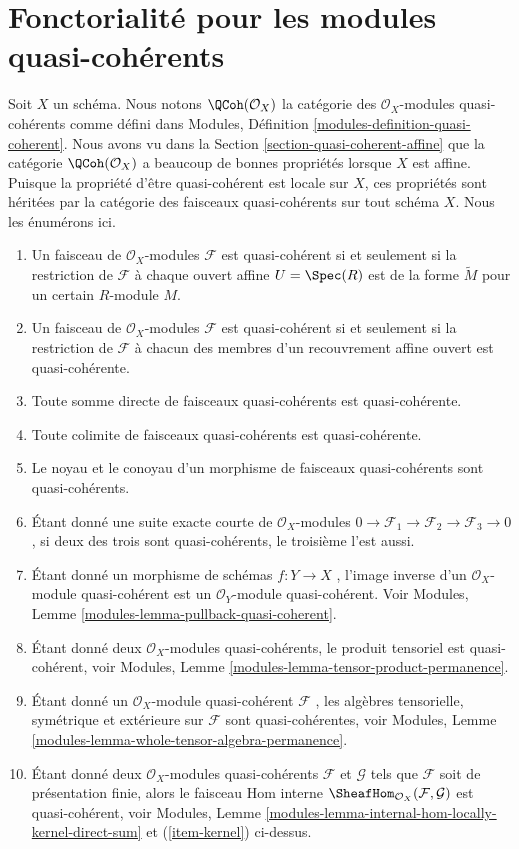\section{Fonctorialité pour les modules quasi-cohérents}
\label{section-quasi-coherent}

\noindent
Soit  $X$  un schéma. Nous notons  $\QCoh(\mathcal{O}_X)$  la catégorie des
 $\mathcal{O}_X$-modules quasi-cohérents comme défini dans Modules, Définition
 \ref{modules-definition-quasi-coherent}. Nous avons vu dans la Section  \ref{section-quasi-coherent-affine}  que la catégorie
 $\QCoh(\mathcal{O}_X)$  a beaucoup de bonnes propriétés lorsque  $X$  est affine.
Puisque la propriété d'être quasi-cohérent est locale sur  $X$, ces
propriétés sont héritées par la catégorie des faisceaux quasi-cohérents sur tout
schéma  $X$. Nous les énumérons ici.
\begin{enumerate}
\item Un faisceau de  $\mathcal{O}_X$-modules  $\mathcal{F}$  est quasi-cohérent si et
seulement si la restriction de  $\mathcal{F}$  à chaque ouvert affine  $U = \Spec(R)$ 
est de la forme  $\widetilde M$  pour un certain  $R$-module  $M$.
\item Un faisceau de  $\mathcal{O}_X$-modules  $\mathcal{F}$  est quasi-cohérent si et
seulement si la restriction de  $\mathcal{F}$  à chacun des membres d'un recouvrement
affine ouvert est quasi-cohérente.
\item Toute somme directe de faisceaux quasi-cohérents est quasi-cohérente.
\item Toute colimite de faisceaux quasi-cohérents est quasi-cohérente.
\item
\label{item-kernel}
Le noyau et le conoyau d'un morphisme de faisceaux quasi-cohérents sont
quasi-cohérents.
\item Étant donné une suite exacte courte de  $\mathcal{O}_X$-modules  $0 \to \mathcal{F}_1 \to \mathcal{F}_2 \to \mathcal{F}_3 \to 0$ , si deux
des trois sont quasi-cohérents, le troisième l'est aussi.
\item Étant donné un morphisme de schémas  $f : Y \to X$ , l'image inverse d'un
 $\mathcal{O}_X$-module quasi-cohérent est un  $\mathcal{O}_Y$-module quasi-cohérent. Voir
Modules, Lemme  \ref{modules-lemma-pullback-quasi-coherent}.
\item Étant donné deux  $\mathcal{O}_X$-modules quasi-cohérents, le produit tensoriel est
quasi-cohérent, voir Modules, Lemme  \ref{modules-lemma-tensor-product-permanence}.
\item Étant donné un  $\mathcal{O}_X$-module quasi-cohérent  $\mathcal{F}$ , les algèbres
tensorielle, symétrique et extérieure sur  $\mathcal{F}$  sont quasi-cohérentes, voir
Modules, Lemme  \ref{modules-lemma-whole-tensor-algebra-permanence}.
\item Étant donné deux  $\mathcal{O}_X$-modules quasi-cohérents  $\mathcal{F}$ et  $\mathcal{G}$ 
tels que  $\mathcal{F}$  soit de présentation finie, alors le faisceau Hom interne  $\SheafHom_{\mathcal{O}_X}(\mathcal{F}, \mathcal{G})$ 
est quasi-cohérent, voir Modules, Lemme  \ref{modules-lemma-internal-hom-locally-kernel-direct-sum}  et (\ref{item-kernel}) ci-dessus.
\end{enumerate}
